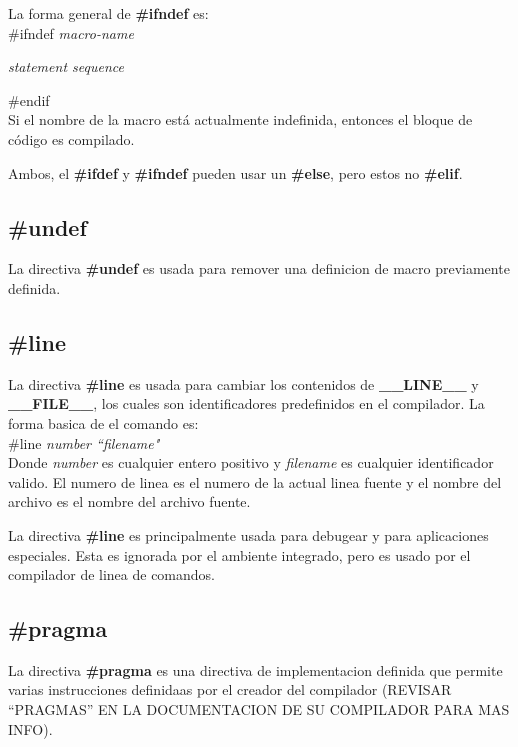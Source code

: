 \documentclass[]{article}
\begin{document}
			La forma general de \textbf{\#ifndef} es:\\
			
			\#ifndef \textit{macro-name}
			
			\hspace{11pt}\textit{statement sequence}
			
			\#endif\\
			
			Si el nombre de la macro está actualmente indefinida, entonces el bloque de código es compilado.
			
			Ambos, el \textbf{\#ifdef} y \textbf{\#ifndef} pueden usar un \textbf{\#else}, pero estos no \textbf{\#elif}.
			
		\subsection{\#undef}
		
		La directiva \textbf{\#undef} es usada para remover una definicion de macro previamente definida.
		
		\subsection{\#line}
		
		La directiva \textbf{\#line} es usada para cambiar los contenidos de \textbf{\_\_LINE\_\_} y \textbf{\_\_FILE\_\_}, los cuales son identificadores predefinidos en el compilador. La forma basica de el comando es:\\
		
			\#line \textit{number ``filename"}\\
			
		Donde \textit{number} es cualquier entero positivo y \textit{filename} es cualquier identificador valido. El numero de linea es el numero de la actual linea fuente y el nombre del archivo es el nombre del archivo fuente.
		
		La directiva \textbf{\#line} es principalmente usada para debugear y para aplicaciones especiales. Esta es ignorada por el ambiente integrado, pero es usado por el compilador de linea de comandos.
		
		\subsection{\#pragma}
		
		La directiva \textbf{\#pragma} es una directiva de implementacion definida que permite varias instrucciones definidaas por el creador del compilador (REVISAR ``PRAGMAS'' EN LA DOCUMENTACION DE SU COMPILADOR PARA MAS INFO).
		
\end{document}
